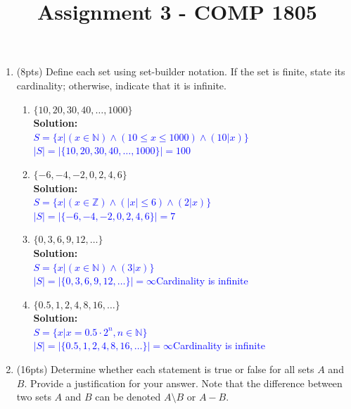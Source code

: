 \documentclass{article}
\newcommand{\sol}[1]{\textbf{Solution:\,}\textcolor{blue}{#1}}
\begin{document}

\title{Assignment 3 - COMP 1805}
\date{} %
\maketitle
\thispagestyle{fancy}



\medskip
\begin{enumerate}



\item(8pts) Define each set using set-builder notation. If the set is finite, state its cardinality; otherwise, indicate that it is infinite.

\begin{enumerate}
\item $\{ 10, 20, 30, 40,  \ldots, 1000 \}$
\\\sol{
\\$S=\{x|(x\in\mathbb{N})\land(10\leq x\leq 1000)\land (10|x)\}$
\\$|S|=|\{ 10, 20, 30, 40,  \ldots, 1000 \}|=100$
}
\item $\{ -6, -4, -2, 0, 2, 4, 6 \}$
\\\sol{
\\$S=\{x|(x\in\mathbb{Z})\land(|x|\leq 6)\land (2|x)\}$
\\$|S|=|\{ -6, -4, -2, 0, 2, 4, 6 \}|=7$
}
\item $\{ 0,3,6,9,12, \ldots \}$
\\\sol{
\\$S=\{x|(x\in\mathbb{N})\land(3|x)\}$
\\$|S|=|\{ 0,3,6,9,12, \ldots \}|=\infty$\quad Cardinality is infinite
}
\item $\{ 0.5, 1, 2, 4, 8, 16, \ldots \}$
\\\sol{
\\$S=\{x|x=0.5\cdot2^n,n\in\mathbb{N}\}$
\\$|S|=|\{ 0.5, 1, 2, 4, 8, 16, \ldots \}|=\infty$\quad Cardinality is infinite
}
\end{enumerate}

\newpage

\item(16pts) Determine whether each statement is true or false for all sets $A$ and $B$. Provide a justification for your answer. Note that the difference between two sets $A$ and $B$ can be denoted $A \setminus B$ or $A - B$. 


\end{enumerate}
\end{document}
